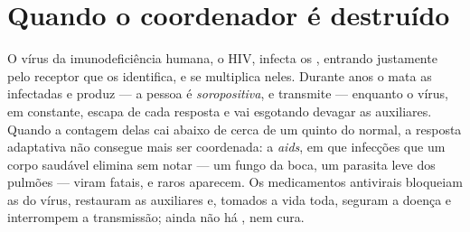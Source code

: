 \section{Quando o coordenador é destruído}

\begin{proposition}\label{prop:g12:adaptive-immunity:hiv}
O vírus da imunodeficiência humana, o HIV, infecta os , entrando justamente pelo receptor que os identifica, e se
multiplica neles. Durante anos o  mata as 
infectadas e produz  --- a pessoa é \emph{soropositiva}, e
transmite --- enquanto o vírus, em  constante, escapa de cada
resposta e vai esgotando devagar as  auxiliares. Quando a
contagem delas cai abaixo de cerca de um quinto do normal, a resposta
adaptativa não consegue mais ser coordenada: a \emph{aids},
em que infecções que um corpo saudável elimina sem notar --- um fungo
da boca, um parasita leve dos pulmões --- viram fatais, e 
raros aparecem. Os medicamentos antivirais bloqueiam as  do
vírus, restauram as  auxiliares e, tomados a vida toda, seguram
a doença e interrompem a transmissão; ainda não há , nem cura.
\end{proposition}
\admitted


